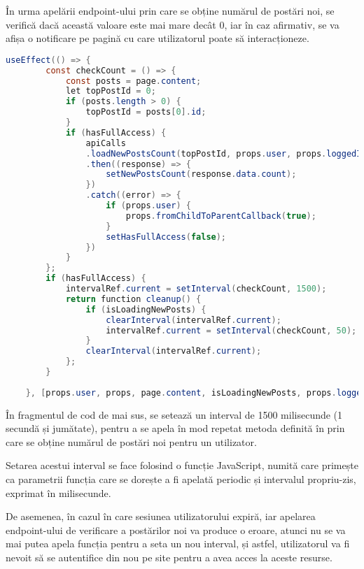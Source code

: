 În urma apelării endpoint-ului prin care se obține numărul de postări noi, se verifică dacă această valoare este mai mare decât 0, iar în caz afirmativ, se va afișa o notificare pe pagină cu care utilizatorul poate să interacționeze.\newline

\begin{lstlisting}[language=Java]
	  useEffect(() => {
		const checkCount = () => {
			const posts = page.content;
			let topPostId = 0;
			if (posts.length > 0) {
				topPostId = posts[0].id;
			}
			if (hasFullAccess) {
				apiCalls
				.loadNewPostsCount(topPostId, props.user, props.loggedInUser.jwt)
				.then((response) => {
					setNewPostsCount(response.data.count);
				})
				.catch((error) => {
					if (props.user) {
						props.fromChildToParentCallback(true);
					}
					setHasFullAccess(false);
				})
			}
		};
		if (hasFullAccess) {
			intervalRef.current = setInterval(checkCount, 1500);
			return function cleanup() {
				if (isLoadingNewPosts) {
					clearInterval(intervalRef.current);
					intervalRef.current = setInterval(checkCount, 50);
				}
				clearInterval(intervalRef.current);
			};
		}
		
	}, [props.user, props, page.content, isLoadingNewPosts, props.loggedInUser, hasFullAccess]);
\end{lstlisting}
\bigskip

În fragmentul de cod de mai sus, se setează un interval de 1500 milisecunde (1 secundă și jumătate), pentru a se apela în mod repetat metoda definită în  prin care se obține numărul de postări noi pentru un utilizator.\newline

Setarea acestui interval se face folosind o funcție JavaScript, numită  care primește ca parametrii funcția care se dorește a fi apelată periodic și intervalul propriu-zis, exprimat în milisecunde.\newline

De asemenea, în cazul în care sesiunea utilizatorului expiră, iar apelarea endpoint-ului de verificare a postărilor noi va produce o eroare, atunci nu se va mai putea apela funcția  pentru a seta un nou interval, și astfel, utilizatorul va fi nevoit să se autentifice din nou pe site pentru a avea acces la aceste resurse.\newline

\label{chap:03}